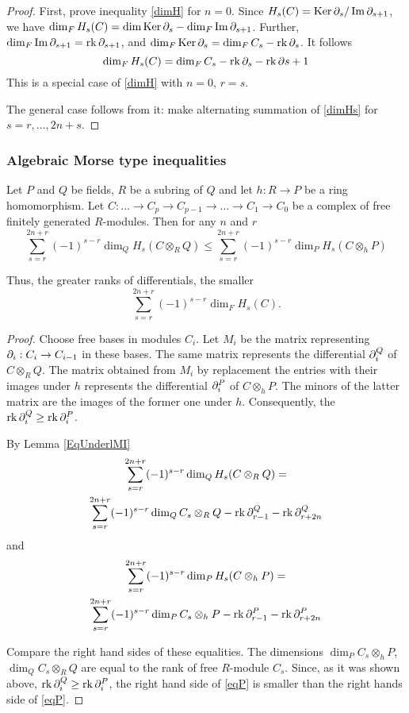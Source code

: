 \documentclass{article}
\numberwithin{equation}{section}
\begin{document}
\begin{proof} First, prove inequality \eqref{dimH} for $n=0$.
Since $H_s(C)=\operatorname{Ker}\partial_s/\operatorname{Im}\partial_{s+1}$, we have
$\dim_FH_s(C)=\dim\operatorname{Ker}\partial_s-\dim_F\operatorname{Im}\partial_{s+1}$. Further,
$\dim_F\operatorname{Im}\partial_{s+1}=\operatorname{rk}\partial_{s+1}$, and
$\dim_F\operatorname{Ker}\partial_s=\dim_FC_s-\operatorname{rk}\partial_s$. It follows
\begin{equation}\label{dimHs}
 \dim_FH_s(C)=\dim_FC_s-\operatorname{rk}\partial_s-\operatorname{rk}\partial{s+1}
\end{equation}
This is a special case of \eqref{dimH} with $n=0$, $r=s$.

The general case follows from it: make alternating summation of
\eqref{dimHs} for $s=r,\dots,2n+s$.
\end{proof}

\subsubsection{Algebraic Morse type inequalities}\label{sT.3.2} 
\begin{Alem}\label{AlgLem}
Let $P$ and $Q$ be fields, $R$ be a subring of $Q$ and let $h:R\to P$ be 
a ring homomorphism. Let $C: \dots\to C_p\to C_{p-1}\to\dots\to C_1\to C_0$
be a complex of free finitely generated $R$-modules. Then for any 
$n$ and $r$ 
$$\sum_{s=r}^{2n+r}(-1)^{s-r}\dim_QH_s(C\otimes_RQ)\le
 \sum_{s=r}^{2n+r}(-1)^{s-r}\dim_PH_s(C\otimes_hP)
$$
\end{Alem}

 Thus, the greater ranks of differentials, the smaller
$$\sum_{s=r}^{2n+r}(-1)^{s-r}\dim_FH_s(C).$$

\begin{proof} 
Choose free bases in modules $C_i$. Let $M_i$ be the matrix representing
 $\partial_i:C_i\to C_{i-1}$ in these bases. The same matrix represents the 
differential $\partial^Q_i$ of $C\otimes_RQ$.  The matrix obtained from $M_i$ by
replacement the entries with their images under $h$ represents the
differential $\partial^P_i$ of $C\otimes_hP$. 
The minors of the latter matrix  are the images of the former one
under $h$. Consequently,  the $\operatorname{rk}\partial^Q_i\ge\operatorname{rk}\partial^P_i$. 

By Lemma \ref{EqUnderlMI}
\begin{multline}\label{eqQ}
 \sum_{s=r}^{2n+r}(-1)^{s-r}\dim_QH_s(C\otimes_RQ)= \\
  \sum_{s=r}^{2n+r}(-1)^{s-r}\dim_QC_s\otimes_RQ-\operatorname{rk}\partial^Q_{r-1}-\operatorname{rk}\partial^Q_{r+2n}
\end{multline}
and
 \begin{multline}\label{eqP}
 \sum_{s=r}^{2n+r}(-1)^{s-r}\dim_PH_s(C\otimes_hP)= \\
  \sum_{s=r}^{2n+r}(-1)^{s-r}\dim_PC_s\otimes_hP-\operatorname{rk}\partial^P_{r-1}-\operatorname{rk}\partial^P_{r+2n}
\end{multline} 

Compare the right hand sides of these equalities. 
The dimensions $\dim_PC_s\otimes_hP$, $\dim_QC_s\otimes_RQ$ are equal to
the rank of free $R$-module $C_s$.
Since, as it was shown above,  $\operatorname{rk}\partial^Q_i\ge\operatorname{rk}\partial^P_i$, the right hand
side of \eqref{eqP} is smaller than the right hands side of \eqref{eqP}.
\end{proof}
\end{document}
